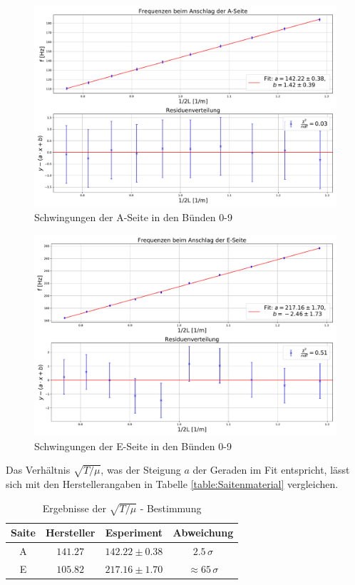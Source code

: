 \documentclass[a4paper, 11pt]{article}
\begin{document}
\begin{figure}[H]
	\centering
	\includegraphics[scale=0.45]{../Plots/A-Seite.pdf}
	\caption{Schwingungen der A-Seite in den Bünden 0-9}
	\label{fig:ASaite}
\end{figure}
\begin{figure}[H]
	\centering
	\includegraphics[scale=0.45]{../Plots/E-Seite.pdf}
	\caption{Schwingungen der E-Seite in den Bünden 0-9}
	\label{fig:ESaite}
\end{figure}

Das Verhältnis $\sqrt{T/\mu}$, was der Steigung $a$ der Geraden im Fit entspricht, lässt sich mit den  Herstellerangaben in Tabelle  \ref{table:Saitenmaterial} vergleichen.
 
\begin{table}[H]
	\centering
	\renewcommand{\arraystretch}{1.2}
	\begin{tabular}{|c|c|c|c|}
		\hline
		Saite & Hersteller & Esperiment & Abweichung  \\
		\hline 
		A & $141.27$ & $142.22 \pm 0.38$ & $2.5\,\sigma$ \\
		E & $105.82$ & $217.16 \pm 1.70$ & $\approx 65\,\sigma$ \\
		\hline
	\end{tabular}
	\caption{Ergebnisse der $\sqrt{T/\mu}$ - Bestimmung}
	\label{table:Tmu}
\end{table}
\end{document}
